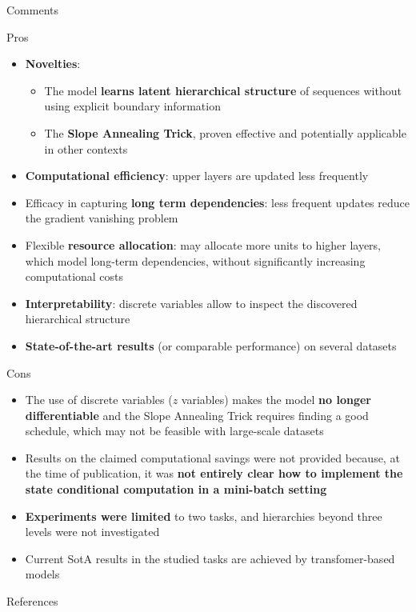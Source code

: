 \documentclass[12pt]{beamer}
\begin{document}
\begin{frame}[shrink=24]{Comments}
\footnotesize \let\small\footnotesize %
\begin{exampleblock}{Pros}
\begin{itemize}
\item \textbf{Novelties}:
\begin{itemize}
\item The model \textbf{learns latent hierarchical structure} of sequences without using explicit boundary information
\item The \textbf{Slope Annealing Trick}, proven effective and potentially applicable in other contexts
\end{itemize}
\item \textbf{Computational efficiency}: upper layers are updated less frequently
\item Efficacy in capturing \textbf{long term dependencies}: less frequent updates reduce the gradient vanishing problem
\item Flexible \textbf{resource allocation}: may allocate more units to higher layers, which model long-term dependencies, without significantly increasing computational costs
\item \textbf{Interpretability}: discrete variables allow to inspect the discovered hierarchical structure
\item \textbf{State-of-the-art results} (or comparable performance) on several datasets
\end{itemize}
\end{exampleblock}
\begin{alertblock}{Cons}
\begin{itemize}
\item The use of discrete variables ($z$ variables) makes the model \textbf{no longer differentiable} and the Slope Annealing Trick requires finding a good schedule, which may not be feasible with large-scale datasets
\item Results on the claimed computational savings were not provided because, at the time of publication, it was \textbf{not entirely clear how to implement the state conditional computation in a mini-batch setting} \cite{review}
\item \textbf{Experiments were limited} to two tasks, and hierarchies beyond three levels were not investigated
\item Current SotA results in the studied tasks are achieved by transfomer-based models \cite{radford2019language}
\end{itemize}
\end{alertblock}
\end{frame}
\begin{frame}[shrink=50]{References}
\begin{multicols}{2}
\footnotesize
\nocite{chung2016hierarchical}
\printbibliography
\end{multicols}
\end{frame}
\end{document}
